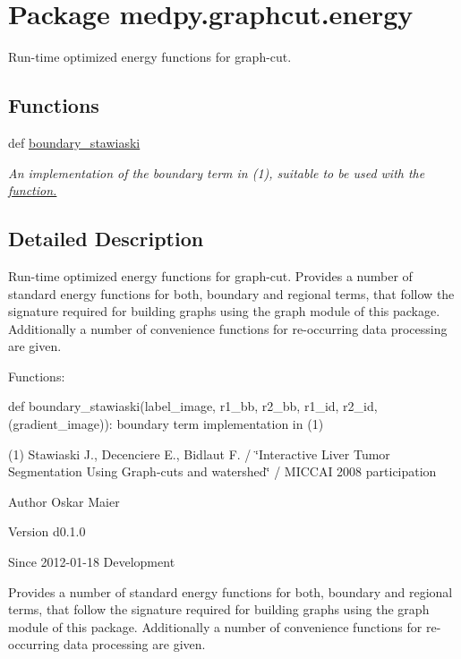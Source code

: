 \hypertarget{namespacemedpy_1_1graphcut_1_1energy}{
\section{Package medpy.graphcut.energy}
\label{namespacemedpy_1_1graphcut_1_1energy}
}


Run-\/time optimized energy functions for graph-\/cut.  


\subsection*{Functions}
\begin{DoxyCompactItemize}
\item 
def \hyperlink{namespacemedpy_1_1graphcut_1_1energy_a2bf88e97c3a4d86bfa293ead5bdefb33}{boundary\_\-stawiaski}
\begin{DoxyCompactList}\small\item\em An implementation of the boundary term in (1), suitable to be used with the \hyperlink{}{function. }\end{DoxyCompactList}\end{DoxyCompactItemize}


\subsection{Detailed Description}
Run-\/time optimized energy functions for graph-\/cut. Provides a number of standard energy functions for both, boundary and regional terms, that follow the signature required for building graphs using the graph module of this package. Additionally a number of convenience functions for re-\/occurring data processing are given.

Functions:
\begin{DoxyItemize}
\item def boundary\_\-stawiaski(label\_\-image, r1\_\-bb, r2\_\-bb, r1\_\-id, r2\_\-id, (gradient\_\-image)): boundary term implementation in (1)
\end{DoxyItemize}

(1) Stawiaski J., Decenciere E., Bidlaut F. / \char`\"{}Interactive Liver Tumor Segmentation
 Using Graph-\/cuts and watershed\char`\"{} / MICCAI 2008 participation

\begin{DoxyAuthor}{Author}
Oskar Maier 
\end{DoxyAuthor}
\begin{DoxyVersion}{Version}
d0.1.0 
\end{DoxyVersion}
\begin{DoxySince}{Since}
2012-\/01-\/18  Development
\end{DoxySince}
Provides a number of standard energy functions for both, boundary and regional terms, that follow the signature required for building graphs using the graph module of this package. Additionally a number of convenience functions for re-\/occurring data processing are given.

